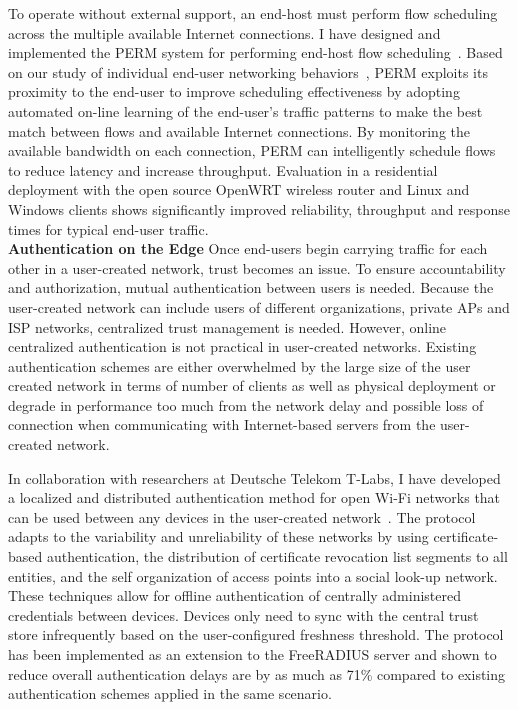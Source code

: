 \documentclass[10pt]{article}
\begin{document}
To operate without external support, an end-host must perform flow scheduling
across the multiple available Internet connections.  I have designed and
implemented the PERM system for performing end-host flow
scheduling~\cite{thompson:perm:infocom06}.
Based on our study of individual end-user networking
behaviors~\cite{he:traffic:mobihoc05}, PERM 
exploits its proximity to the end-user to improve scheduling effectiveness
by adopting automated on-line learning of the
end-user's traffic patterns to make the best match between flows and available
Internet connections.  
By monitoring the available bandwidth on each connection, PERM can intelligently
schedule flows to reduce latency and increase throughput.
Evaluation in a residential deployment with the open source OpenWRT wireless
router and Linux and Windows clients shows 
significantly improved reliability, throughput and response times for typical
end-user traffic.  \\


\noindent \textbf{Authentication on the Edge}
Once end-users begin carrying traffic for each other in a user-created network,
trust becomes an issue.  
To ensure accountability and authorization, mutual authentication between users
is needed.
Because the user-created network can include users of different organizations,
private APs and ISP networks,
centralized trust management is needed.
However, online centralized authentication
is not practical in user-created networks.  Existing authentication schemes are
either overwhelmed by the large size of the
user created network in terms of number of clients as well as physical
deployment or degrade in performance too much from the network delay and
possible loss of connection when
communicating with Internet-based servers from the user-created network.

In collaboration with researchers at Deutsche Telekom T-Labs, I have developed
a localized and distributed
authentication method for open Wi-Fi networks that can be used between any
devices in the user-created
network~\cite{thompson:age:mobicom07, thompson:organic:hotmobile08}.
The protocol
adapts to the variability and unreliability of these networks by using 
certificate-based authentication, the distribution of certificate revocation
list segments to all entities, and the self organization of access points into a
social look-up network.  These techniques allow for offline authentication of
centrally administered credentials between devices.  Devices only need to sync
with the central
trust store infrequently based on the user-configured freshness threshold.
The protocol has been implemented as an extension to the FreeRADIUS server and
shown to reduce overall
authentication delays are by as much as 71\% compared to existing
authentication schemes applied in the same scenario.   \\
\end{document}
